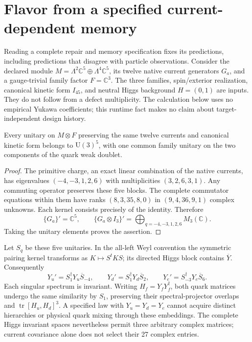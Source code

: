 \section{Flavor from a specified current-dependent memory}
\label{sec:source-flavor-orbit}

Reading a complete repair and memory specification fixes its predictions,
including predictions that disagree with particle observations. Consider the
declared module
\(M=\Lambda^2\mathbb C^5\oplus\Lambda^4\mathbb C^5\), its twelve native
current generators \(G_a\), and a gauge-trivial family factor
\(F=\mathbb C^3\). The three families, spin/exterior realization, canonical
kinetic form \(I_{45}\), and neutral Higgs background \(H=(0,1)\) are inputs.
They do not follow from a defect multiplicity. The calculation below uses no
empirical Yukawa coefficients; this runtime fact makes no claim about
target-independent design history.

\begin{proposition}
\label{prop:source-flavor-orbit}
Every unitary on \(M\otimes F\) preserving the same twelve currents and
canonical kinetic form belongs to \(\mathrm U(3)^5\), with one common
family unitary on the two components of the quark weak doublet.
\end{proposition}
\begin{proof}
The primitive charge, an exact linear combination of the native currents,
has eigenvalues \((-4,-3,1,2,6)\) with multiplicities \((3,2,6,3,1)\).
Any commuting operator preserves these five blocks. The complete
commutator equations within them have ranks \((8,3,35,8,0)\) in
\((9,4,36,9,1)\) complex unknowns. Each kernel consists precisely of the
identity. Therefore
\begin{equation}
 \{G_a\}'=\mathbb C^5,\qquad
 \{G_a\otimes I_3\}'=\bigoplus_{q=-4,-3,1,2,6}M_3(\mathbb C).
 \label{eq:source-flavor-commutant}
\end{equation}
Taking the unitary elements proves the assertion.
\end{proof}

Let \(S_q\) be these five unitaries. In the all-left Weyl convention the
symmetric pairing kernel transforms as \(K\mapsto S^tKS\); its directed
Higgs block contains \(\overline Y\). Consequently
\begin{equation}
 Y_u'=S_1^\dagger Y_u\overline S_{-4},\qquad
 Y_d'=S_1^\dagger Y_d\overline S_2,\qquad
 Y_e'=S_{-3}^\dagger Y_e\overline S_6.
 \label{eq:source-flavor-transform}
\end{equation}
Each singular spectrum is invariant. Writing \(H_f=Y_fY_f^\dagger\),
both quark matrices undergo the same similarity by \(S_1\), preserving
their spectral-projector overlaps and \(\operatorname{tr}[H_u,H_d]^3\).
A specified law with \(Y_u=Y_d=Y_e\) cannot acquire distinct hierarchies
or physical quark mixing through these embeddings. The complete Higgs
invariant spaces nevertheless permit three arbitrary complex matrices;
current covariance alone does not select their 27 complex entries.

